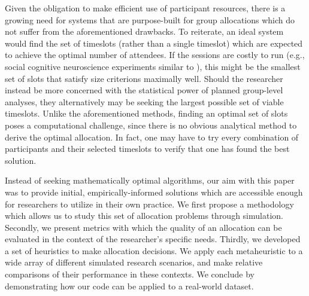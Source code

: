 \documentclass{article}
\begin{document}
  \par 
  Given the obligation to make efficient use of participant resources, 
  there is a growing need for systems that are purpose-built for group allocations which do not suffer from the aforementioned drawbacks.
  To reiterate, an ideal system would find the set of timeslots (rather than a single timeslot) which are expected to achieve the optimal number of attendees. 
  If the sessions are costly to run (e.g., social cognitive neuroscience experiments similar to \cite{bevilacquaBraintoBrainSynchronyLearning2019}),
  this might be the smallest set of slots that satisfy size criterions maximally well.
  Should the researcher instead be more concerned with the statistical power of 
  planned group-level analyses, they alternatively may be seeking the largest possible set of viable timeslots.
  Unlike the aforementioned methods, finding an optimal set of slots poses a computational challenge, since there is no obvious analytical method to derive the optimal allocation.
  In fact, one may have to try every combination of participants and their selected timeslots to verify that one has found the best solution.
  
  \par
  Instead of seeking mathematically optimal algorithms, our aim with this paper was to provide initial, empirically-informed solutions
  which are accessible enough for researchers to utilize in their own practice.
  We first propose a methodology which allows us to study this set of allocation problems through simulation.
  Secondly, we present metrics with which the quality of an allocation can be evaluated in the context of the researcher's specific needs.
  Thirdly, we developed a set of heuristics to make allocation decisions. 
  We apply each metaheuristic to a wide array of different simulated research scenarios, and make relative comparisons of their performance in these contexts.
  We conclude by demonstrating how our code can be applied to a real-world dataset. 

  
  
  \printbibliography
\end{document}
